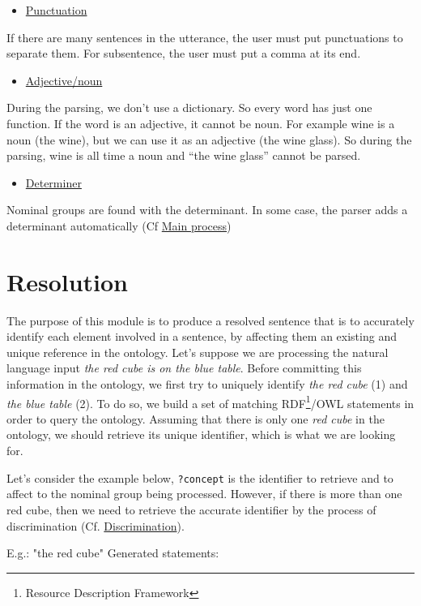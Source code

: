 \documentclass[twoside,a4paper,10pt]{report}
\newcommand{\dokutitlelevelone}[1]{} %
\newcommand{\dokutitleleveltwo}[1]{\chapter{#1}}
\newcommand{\dokufootnote}[1]{\footnote{#1}}
\newcommand{\dokuitalic}[1]{\textsl{#1}}
\newcommand{\dokumonospace}[1]{\texttt{#1}}
\newcommand{\dokuunderline}[1]{\underline{#1}}
\newcommand{\dokuitem}{\item}
\begin{document}
\begin{itemize}
\dokuitem  \dokuunderline{Punctuation}
\end{itemize}
If there are many sentences in the utterance, the user must put punctuations to separate them. For subsentence, the user must put a comma at its end.


\begin{itemize}
\dokuitem  \dokuunderline{Adjective/noun}
\end{itemize}
During the parsing, we don’t use a dictionary. So every word has just one function. If the word is an adjective, it cannot be noun. For example wine is a noun (the wine), but we can use it as an adjective (the wine glass). So during the parsing, wine is all time a noun and “the wine glass” cannot be parsed.


\begin{itemize}
\dokuitem  \dokuunderline{Determiner}
\end{itemize}
Nominal groups are found with the determinant. In some case, the parser adds a determinant automatically (Cf \hyperref[0e76170b5e24f80d8e04eca241527e68]{Main process})


\dokutitlelevelone{Reference grounding}
\label{d0c18356358d3557c631fba761c15653}%

\dokutitleleveltwo{Resolution}
\label{b7e164b34ff76b1cda93a058604190da}%
The purpose of this module is to produce a resolved sentence that is to accurately identify each element involved in a sentence, by affecting them an existing and unique reference in the ontology.
Let's suppose we are processing the natural language input \dokuitalic{the red cube is on the blue table}. Before committing this information in the ontology, we first try to uniquely identify \dokuitalic{the red cube} (1) and \dokuitalic{the blue table} (2).
To do so, we build a set of matching RDF\dokufootnote{Resource Description Framework}/OWL statements in order to query the ontology. 
Assuming that there is only one \dokuitalic{red cube} in the ontology, we should retrieve its unique identifier, which is what we are looking for.

Let's consider the example below, \dokumonospace{?concept} is the identifier to retrieve and to affect to the nominal group being processed.    
However, if there is more than one red cube, then we need to retrieve the accurate identifier by the process of discrimination (Cf. \hyperref[974418acf6ac4871b739b9591436865a]{Discrimination}). 

E.g.:  "the red cube"
  Generated statements:
\end{document}
